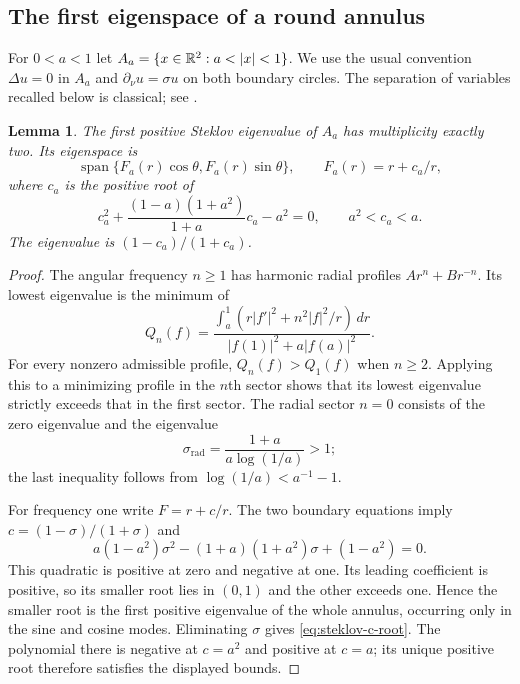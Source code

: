 \documentclass[11pt,a4paper]{article}
\newtheorem{lemma}[theorem]{Lemma}
\theoremstyle{definition}\newtheorem{definition}[theorem]{Definition}
\theoremstyle{remark}\newtheorem{remark}[theorem]{Remark}
\begin{document}
\subsection{The first eigenspace of a round annulus}

For $0<a<1$ let $A_a=\{x\in\R^2:a<|x|<1\}$. We use the usual convention
$\Delta u=0$ in $A_a$ and $\partial_\nu u=\sigma u$ on both boundary
circles. The separation of variables recalled below is classical; see
\cite[Example~4.2.5]{GP2017}.

\begin{lemma}\label{lem:steklov-annulus}
The first positive Steklov eigenvalue of $A_a$ has multiplicity exactly
two. Its eigenspace is
\[
 \operatorname{span}\{F_a(r)\cos\theta,F_a(r)\sin\theta\},
 \qquad F_a(r)=r+c_a/r,
\]
where $c_a$ is the positive root of
\begin{equation}\label{eq:steklov-c-root}
 c_a^2+\frac{(1-a)(1+a^2)}{1+a}c_a-a^2=0,
 \qquad a^2<c_a<a.
\end{equation}
The eigenvalue is $(1-c_a)/(1+c_a)$.
\end{lemma}

\begin{proof}
The angular frequency $n\geq1$ has harmonic radial profiles
$Ar^n+Br^{-n}$. Its lowest eigenvalue is the minimum of
\[
 Q_n(f)=
 \frac{\displaystyle\int_a^1\left(r|f'|^2+n^2|f|^2/r\right)\,dr}
 {\displaystyle |f(1)|^2+a|f(a)|^2}.
\]
For every nonzero admissible profile, $Q_n(f)>Q_1(f)$ when $n\geq2$.
Applying this to a minimizing profile in the $n$th sector shows that its
lowest eigenvalue strictly exceeds that in the first sector. The radial
sector $n=0$ consists of the zero eigenvalue and the eigenvalue
\[
 \sigma_{\mathrm{rad}}=\frac{1+a}{a\log(1/a)}>1;
\]
the last inequality follows from $\log(1/a)<a^{-1}-1$.

For frequency one write $F=r+c/r$. The two boundary equations imply
$c=(1-\sigma)/(1+\sigma)$ and
\[
 a(1-a^2)\sigma^2-(1+a)(1+a^2)\sigma+(1-a^2)=0.
\]
This quadratic is positive at zero and negative at one. Its leading
coefficient is positive, so its smaller root lies in $(0,1)$ and the
other exceeds one. Hence the smaller root is the first positive
eigenvalue of the whole annulus, occurring only in the sine and cosine
modes. Eliminating $\sigma$ gives \eqref{eq:steklov-c-root}. The polynomial
there is negative at $c=a^2$ and positive at $c=a$; its unique positive
root therefore satisfies the displayed bounds.
\end{proof}
\end{document}
